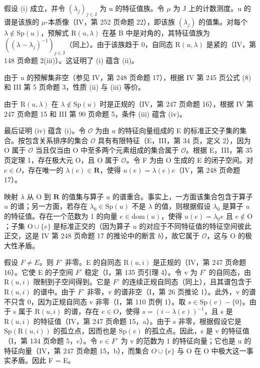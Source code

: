 假设 (i) 成立，并令 \((\lambda_{j})_{j\in\mathrm{J}}\) 为 u 的特征值族。令 \(\mu\) 为 J 上的计数测度。u 的谱是该族的 \(\mu\)-本质像（IV，第 252 页命题 22），即该族 \((\lambda_{j})\) 的值集。对每个 \(\lambda\notin\mathrm{Sp}(u)\)，预解式 \(\mathrm{R}(u,\lambda)\) 在基 B 中是对角的，其特征值族为 \(((\lambda-\lambda_{j})^{-1})_{j\in\mathrm{J}}\)（同上）。由于该族趋于 0，自同态 \(\mathrm{R}(u,\lambda)\) 是紧的（IV，第 148 页命题 2(iii)）。这证明了 (i) 蕴含 (ii)。

由于 \(u\) 的预解集非空（参见 IV，第 248 页命题 17），根据 IV 第 245 页公式 (8) 和 III 第 5 页命题 3，性质 (ii) 与 (iii) 等价。

由于 \(\mathrm{R}(u,\lambda)\) 在 \(\lambda\notin\mathrm{Sp}(u)\) 时是正规的（IV，第 247 页命题 16），根据 IV 第 247 页命题 15 和 III 第 90 页命题 5，条件 (iii) 蕴含 (iv)。

最后证明 (iv) 蕴含 (i)。令 \(\mathcal{O}\) 为由 \(u\) 的特征向量组成的 E 的标准正交子集的集合。按包含关系排序的集合 \(\mathcal{O}\) 具有有限特征（E，III，第 34 页，定义 2），因为 O 属于 \(\mathcal{O}\) 当且仅当由 O 中至多两个元素组成的集合属于 \(\mathcal{O}\)。根据 E，III，第 35 页定理 1，存在极大元 O，且 O 属于 \(\mathcal{O}\)。令 F 为由 O 生成的 E 的闭子空间。对 \(e \in O\)，存在唯一的 \(\lambda(e) \in \mathbf{R}\)，使得 \(u(e) = \lambda(e)e\)（IV，第 248 页命题 17）。

 映射 \(\lambda\) 从 O 到 \(\mathbf{R}\) 的值集与算子 \(u\) 的谱重合。事实上，一方面该集合包含于算子 \(u\) 的谱；另一方面，若存在 \(\lambda_0 \in \mathrm{Sp}(u)\) 不是 \(\lambda\) 的值，则根据假设 \(\lambda_0\) 是算子 \(u\) 的特征值。存在一个范数为 1 的向量 \(e \in \mathrm{dom}(u)\)，使得 \(u(e) = \lambda_0 e\) 且 \(e \notin \mathrm{O}\)；子集 \(\mathrm{O} \cup \{e\}\) 是标准正交的（因为算子 \(u\) 的对应于不同特征值的特征空间彼此正交，这是 IV 第 248 页命题 17 的推论中的断言 \(b\)），故它属于 \(\mathcal{O}\)，这与 O 的极大性矛盾。

假设 \(F \neq E\)。则 \(F^{\circ}\) 非零。E 的自同态 \(\mathrm{R}(u,i)\) 是正规的（IV，第 247 页命题 16）。它使 E 的子空间 \(F^{\circ}\) 稳定（I，第 135 页引理 4）。令 v 为 \(F^{\circ}\) 的自同态，由 \(\mathrm{R}(u,i)\) 限制到子空间得到。它是 \(F^{\circ}\) 的连续正规自同态（同上），且其谱包含于 \(\mathrm{R}(u,i)\) 的谱中。由于 \(F^{\circ}\) 非零，v 的谱非空（I，第 26 页推论 1）。此外，v 的谱不只含 0，因为正规自同态 v 非零（I，第 110 页例 1）。取 \(s \in \mathrm{Sp}(v) - \{0\}\)。由于 s 属于 \(\mathrm{R}(u,i)\) 的谱，存在 \(e \in O\)，使得 \(s = (i - \lambda(e))^{-1}\)，且 s 是 \(\mathrm{R}(u,i)\) 的特征值（IV，第 247 页命题 15，a）。由于 s 非零，根据假设它是 \(\mathrm{Sp}(\mathrm{R}(u,i))\) 的孤立点，因而也是 \(\mathrm{Sp}(v)\) 的孤立点。因此，s 是 v 的特征值（I，第 134 页命题 5，c）。令 \(e \in F^{\circ}\) 为 v 的范数为 1 的特征向量；它也是 u 的特征向量（IV，第 247 页命题 15，b），而集合 \(O \cup \{e\}\) 与 O 在 O 中极大这一事实矛盾。因此 F = E。

